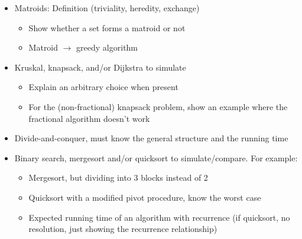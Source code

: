 \begin{itemize}
    \item Matroids: Definition (triviality, heredity, exchange)
	\begin{itemize}
	    \item Show whether a set forms a matroid or not
	    \item Matroid $\to$ greedy algorithm
	\end{itemize}
\end{itemize}

\begin{itemize}
    \item Kruskal, knapsack, and/or Dijkstra to simulate
	\begin{itemize}
	    \item Explain an arbitrary choice when present
	    \item For the (non-fractional) knapsack problem, show an example where the fractional algorithm doesn't work
	\end{itemize}
\end{itemize}

\begin{itemize}
    \item Divide-and-conquer, must know the general structure and the running time
\end{itemize}

\begin{itemize}
    \item Binary search, mergesort and/or quicksort to simulate/compare. For example:
	\begin{itemize}
	    \item Mergesort, but dividing into 3 blocks instead of 2
	    \item Quicksort with a modified pivot procedure, know the worst case
	    \item Expected running time of an algorithm with recurrence (if quicksort, no resolution, just showing the recurrence relationship)
	\end{itemize}
\end{itemize}



